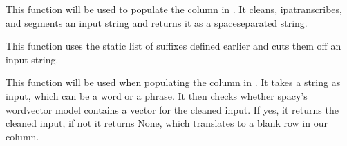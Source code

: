 \documentclass[letterpaper,10pt,english]{sphinxmanual}
\begin{document}
{{{{\sphinxAtStartPar
This function will be used to populate the column  in
. It cleans, ipa\sphinxhyphen{}transcribes, and segments
an input string and returns it as a space\sphinxhyphen{}separated string.

\begin{sphinxVerbatim}[commandchars=\\\{\}]
 
       \PYG{p}{[} \PYG{p}{]}
         
       
\end{sphinxVerbatim}

\sphinxAtStartPar
This function uses the static list of suffixes defined earlier and cuts
them off an input string.

\begin{sphinxVerbatim}[commandchars=\\\{\}]
 
      
         
\end{sphinxVerbatim}

\sphinxAtStartPar
This function will be used when populating the column  in
. It takes a string as input, which can be a word
or a phrase. It then checks whether spacy’s word\sphinxhyphen{}vector model contains a
vector for the cleaned input. If yes, it returns the cleaned input, if not
it returns None, which translates to a blank row in our column.

\begin{sphinxVerbatim}[commandchars=\\\{\}]
 
      
      


\end{sphinxVerbatim}}}}}
\end{document}
